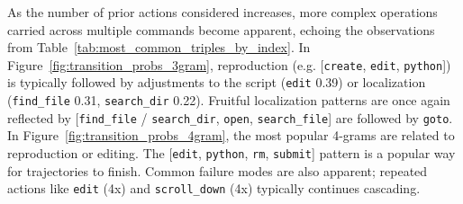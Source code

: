 As the number of prior actions considered increases, more complex operations carried across multiple commands become apparent, echoing the observations from Table~\ref{tab:most_common_triples_by_index}.
In Figure~\ref{fig:transition_probs_3gram}, reproduction (e.g. [\texttt{create}, \texttt{edit}, \texttt{python}]) is typically followed by adjustments to the script (\texttt{edit} \num{0.39}) or localization (\texttt{find\_file} \num{0.31}, \texttt{search\_dir} \num{0.22}).
Fruitful localization patterns are once again reflected by [\texttt{find\_file} / \texttt{search\_dir}, \texttt{open}, \texttt{search\_file}] are followed by \texttt{goto}.
In Figure~\ref{fig:transition_probs_4gram}, the most popular \num{4}-grams are related to reproduction or editing.
The [\texttt{edit}, \texttt{python}, \texttt{rm}, \texttt{submit}] pattern is a popular way for trajectories to finish.
Common failure modes are also apparent; repeated actions like \texttt{edit} (\num{4}x) and \texttt{scroll\_down} (\num{4}x) typically continues cascading.